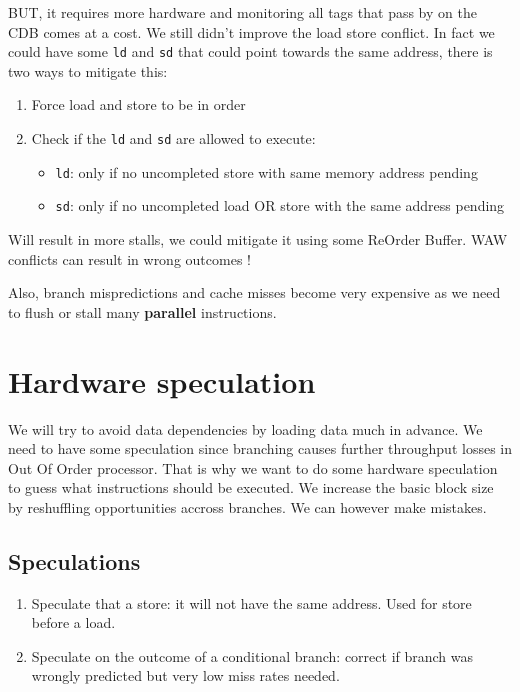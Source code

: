 \documentclass{report}
\begin{document}
BUT, it requires more hardware and monitoring all tags that pass by on the CDB comes at a cost. We still didn't improve the load store conflict. In fact we could have some \texttt{ld} and \texttt{sd} that could point towards the same address, there is two ways to mitigate this:

\begin{enumerate}
    \item Force load and store to be in order
    \item Check if the \texttt{ld} and \texttt{sd} are allowed to execute:
    \begin{itemize}
        \item \texttt{ld}: only if no uncompleted store with same memory address pending
        \item \texttt{sd}: only if no uncompleted load OR store with the same address pending
    \end{itemize}
\end{enumerate}

Will result in more stalls, we could mitigate it using some ReOrder Buffer. WAW conflicts can result in wrong outcomes !

Also, branch mispredictions and cache misses become very expensive as we need to flush or stall many \textbf{parallel} instructions.

\section{Hardware speculation}

We will try to avoid data dependencies by loading data much in advance. We need to have some speculation since branching causes further throughput losses in Out Of Order processor. That is why we want to do some hardware speculation to guess what instructions should be executed. We increase the basic block size by reshuffling opportunities accross branches. We can however make mistakes.

\subsection{Speculations}

\begin{enumerate}
    \item Speculate that a store: it will not have the same address. Used for store before a load.
    \item Speculate on the outcome of a conditional branch: correct if branch was wrongly predicted but very low miss rates needed.
\end{enumerate}
\end{document}
